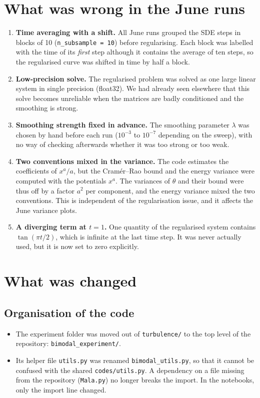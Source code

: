 \documentclass[11pt,a4paper]{article}
\newcommand{\code}[1]{\texttt{#1}}
\begin{document}
\section{What was wrong in the June runs}
\begin{enumerate}
  \item \textbf{Time averaging with a shift.} All June runs grouped the SDE steps in blocks of
        10 (\code{n\_subsample = 10}) before regularising. Each block was labelled with the time
        of its \emph{first} step although it contains the average of ten steps, so the
        regularised curve was shifted in time by half a block.
  \item \textbf{Low-precision solve.} The regularised problem was solved as one large linear system
        in single precision (float32). We had already seen elsewhere that this solve becomes
        unreliable when the matrices are badly conditioned and the smoothing is strong.
  \item \textbf{Smoothing strength fixed in advance.} The smoothing parameter $\lambda$ was chosen
        by hand before each run ($10^{-3}$ to $10^{-7}$ depending on the sweep), with no way of
        checking afterwards whether it was too strong or too weak.
  \item \textbf{Two conventions mixed in the variance.} The code estimates the coefficients of
        $x^a/a$, but the Cram\'er--Rao bound and the energy variance were computed with the
        potentials $x^a$. The variances of $\theta$ and their bound were thus off by a factor
        $a^2$ per component, and the energy variance mixed the two conventions. This is
        independent of the regularisation issue, and it affects the June variance plots.
  \item \textbf{A diverging term at $t = 1$.} One quantity of the regularised system contains
        $\tan(\pi t/2)$, which is infinite at the last time step. It was never actually used,
        but it is now set to zero explicitly.
\end{enumerate}

\section{What was changed}

\subsection*{Organisation of the code}
\begin{itemize}
  \item The experiment folder was moved out of \code{turbulence/} to the top level of the
        repository: \code{bimodal\_experiment/}.
  \item Its helper file \code{utils.py} was renamed \code{bimodal\_utils.py}, so that it cannot be
        confused with the shared \code{codes/utils.py}. A dependency on a file missing from the
        repository (\code{Mala.py}) no longer breaks the import. In the notebooks, only the import line changed.
\end{itemize}
\end{document}
